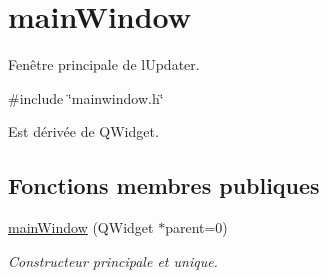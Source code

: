 \hypertarget{classmainWindow}{}\section{main\+Window}
\label{classmainWindow}


Fenêtre principale de l\textquotesingle{}Updater.  




{\ttfamily \#include \char`\"{}mainwindow.\+h\char`\"{}}



Est dérivée de Q\+Widget.

\subsection*{Fonctions membres publiques}
\begin{DoxyCompactItemize}
\item 
\mbox{\label{classmainWindow_ade514f7e438d269e17aee3c2fd023839}} 
\hyperlink{classmainWindow_ade514f7e438d269e17aee3c2fd023839}{main\+Window} (Q\+Widget $\ast$parent=0)
\begin{DoxyCompactList}\small\item\em Constructeur principale et unique. \end{DoxyCompactList}\end{DoxyCompactItemize}
